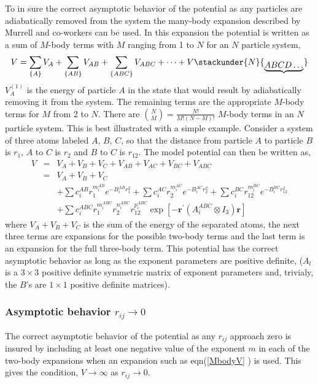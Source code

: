 \documentclass[12pt,thmsa]{article}
\begin{document}
To in sure the correct asymptotic behavior of the potential as any particles
are adiabatically removed from the system the many-body expansion described
by Murrell and co-workers\cite{Murrell84} can be used. In this expansion the
potential is written as a sum of $M$-body terms with $M$ ranging from 1 to $%
N $ for an $N$ particle system, 
\begin{equation}
V=\sum_{\left\{ A\right\} }V_A+\sum_{\left\{ AB\right\}
}V_{AB}+\sum_{\left\{ ABC\right\} }V_{ABC}+\cdots +V\stackunder{N}{_{%
\underbrace{ABCD\ldots }}}
\end{equation}
$V_A^{\left( 1\right) }$ is the energy of particle $A$ in the state that
would result by adiabatically removing it from the system. The remaining
terms are the appropriate $M$-body terms for $M$ from 2 to $N$. There are $%
\binom NM=\frac{N!}{M!\left( N-M\right) !}$ $M$-body terms in an $N$
particle system. This is best illustrated with a simple example. Consider a
system of three atoms labeled $A,\,B,\,C$, so that the distance from
particle $A$ to particle $B$ is $r_1$, $A$ to $C$ is $r_2$ and $B$ to $C$ is 
$r_{12}$. The model potential can then be written as, 
\begin{eqnarray}
V &=&V_A+V_B+V_C+V_{AB}+V_{AC}+V_{BC}+V_{ABC}  \nonumber \\
&=&V_A+V_B+V_C  \nonumber \\
&&+\sum c_i^{AB}r_1^{m_i^{AB}}e^{-B_i^{AB}r_1^2}+\sum
c_i^{AC}r_2^{m_i^{AC}}e^{-B_i^{AC}r_2^2}+\sum
c_i^{BC}r_{12}^{m_i^{BC}}e^{-B_i^{BC}r_{12}^2}  \nonumber \\
&&+\sum c_i^{ABC}r_1^{m_i^{ABC}}r_2^{n_i^{ABC}}r_{12}^{p_i^{ABC}}\exp \left[
-\mathbf{r}^{\prime }\left( A_i^{ABC}\otimes I_3\right) \mathbf{r}\right]
\label{MbodyV}
\end{eqnarray}
where $V_A+V_B+V_C$ is the sum of the energy of the separated atoms, the
next three terms are expansions for the possible two-body terms and the last
term is an expansion for the full three-body term. This potential has the
correct asymptotic behavior as long as the exponent parameters are positive
definite, ($A_l$ is a $3\times 3$ positive definite symmetric matrix of
exponent parameters and, trivialy, the $B$'s are $1\times 1$ positive
definite matrices).

\subsubsection{Asymptotic behavior $r_{ij}\rightarrow 0$}

The correct asymptotic behavior of the potential as any $r_{ij}$ approach
zero is insured by including at least one negative value of the exponent $m$
in each of the two-body expansions when an expansion such as eqn(\ref{MbodyV}%
) is used. This gives the condition, $V\rightarrow \infty $ as $%
r_{ij}\rightarrow 0.$
\end{document}
